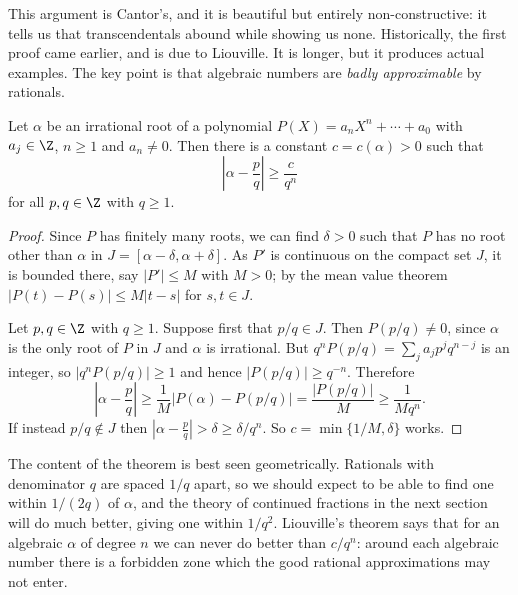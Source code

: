 This argument is Cantor's, and it is beautiful but entirely non-constructive: it tells us that transcendentals abound while showing us none. Historically, the first proof came earlier, and is due to Liouville. It is longer, but it produces actual examples. The key point is that algebraic numbers are \emph{badly approximable} by rationals.

\begin{theorem}[Liouville]\label{thm:liouville}
	Let $\alpha$ be an irrational root of a polynomial $P(X) = a_nX^n+\cdots+a_0$ with $a_j\in\Z$, $n\geq1$ and $a_n\neq0$. Then there is a constant $c = c(\alpha)>0$ such that
	$$\left|\alpha-\frac pq\right| \geq \frac{c}{q^n}$$
	for all $p,q\in\Z$ with $q\geq1$.
\end{theorem}

\begin{proof}
	Since $P$ has finitely many roots, we can find $\delta>0$ such that $P$ has no root other than $\alpha$ in $J = [\alpha-\delta,\alpha+\delta]$. As $P'$ is continuous on the compact set $J$, it is bounded there, say $|P'|\leq M$ with $M > 0$; by the mean value theorem $|P(t)-P(s)|\leq M|t-s|$ for $s,t\in J$.

	Let $p,q\in\Z$ with $q\geq1$. Suppose first that $p/q \in J$. Then $P(p/q)\neq0$, since $\alpha$ is the only root of $P$ in $J$ and $\alpha$ is irrational. But $q^nP(p/q) = \sum_j a_jp^jq^{n-j}$ is an integer, so $|q^nP(p/q)|\geq1$ and hence $|P(p/q)|\geq q^{-n}$. Therefore
	$$\left|\alpha - \frac pq\right| \geq \frac{1}{M}\left|P(\alpha)-P(p/q)\right| = \frac{|P(p/q)|}{M} \geq \frac{1}{Mq^n}.$$
	If instead $p/q\notin J$ then $\left|\alpha - \frac pq\right| > \delta \geq \delta/q^n$. So $c = \min\{1/M,\delta\}$ works.
\end{proof}

The content of the theorem is best seen geometrically. Rationals with denominator $q$ are spaced $1/q$ apart, so we should expect to be able to find one within $1/(2q)$ of $\alpha$, and the theory of continued fractions in the next section will do much better, giving one within $1/q^2$. Liouville's theorem says that for an algebraic $\alpha$ of degree $n$ we can never do better than $c/q^n$: around each algebraic number there is a forbidden zone which the good rational approximations may not enter.

